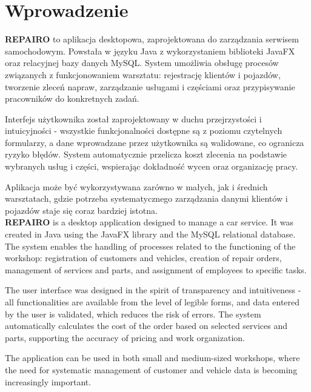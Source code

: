 \chapter{Wprowadzenie}
\label{cha:wstep}

\textbf{REPAIRO} to aplikacja desktopowa, zaprojektowana do zarządzania serwisem samochodowym. Powstała w języku Java z wykorzystaniem biblioteki JavaFX oraz relacyjnej bazy danych MySQL. System umożliwia obsługę procesów związanych z funkcjonowaniem warsztatu: rejestrację klientów i pojazdów, tworzenie zleceń napraw, zarządzanie usługami i częściami oraz przypisywanie pracowników do konkretnych zadań.

Interfejs użytkownika został zaprojektowany w duchu przejrzystości i intuicyjności - wszystkie funkcjonalności dostępne są z poziomu czytelnych formularzy, a dane wprowadzane przez użytkownika są walidowane, co ogranicza ryzyko błędów. System automatycznie przelicza koszt zlecenia na podstawie wybranych usług i części, wspierając dokładność wycen oraz organizację pracy.

Aplikacja może być wykorzystywana zarówno w małych, jak i średnich warsztatach, gdzie potrzeba systematycznego zarządzania danymi klientów i pojazdów staje się coraz bardziej istotna.\\

\textbf{REPAIRO} is a desktop application designed to manage a car service. It was created in Java using the JavaFX library and the MySQL relational database. The system enables the handling of processes related to the functioning of the workshop: registration of customers and vehicles, creation of repair orders, management of services and parts, and assignment of employees to specific tasks.

The user interface was designed in the spirit of transparency and intuitiveness - all functionalities are available from the level of legible forms, and data entered by the user is validated, which reduces the risk of errors. The system automatically calculates the cost of the order based on selected services and parts, supporting the accuracy of pricing and work organization.

The application can be used in both small and medium-sized workshops, where the need for systematic management of customer and vehicle data is becoming increasingly important.